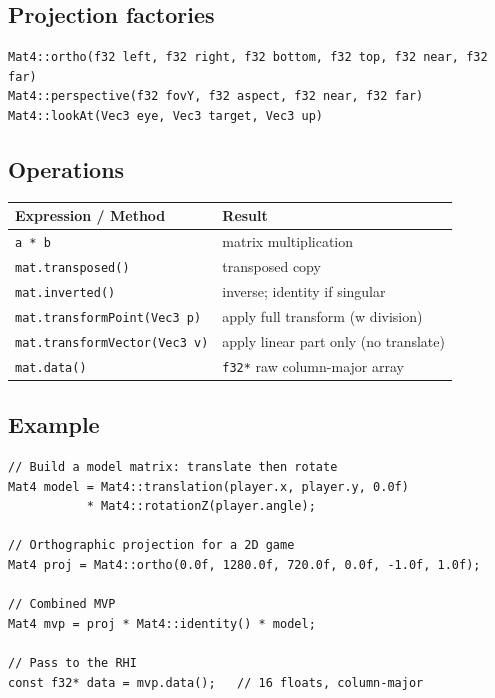\subsection{Projection factories}

\begin{lstlisting}
Mat4::ortho(f32 left, f32 right, f32 bottom, f32 top, f32 near, f32 far)
Mat4::perspective(f32 fovY, f32 aspect, f32 near, f32 far)
Mat4::lookAt(Vec3 eye, Vec3 target, Vec3 up)
\end{lstlisting}

\subsection{Operations}

\begin{longtable}{ll}
\toprule
\textbf{Expression / Method} & \textbf{Result} \\
\midrule
\texttt{a * b}                   & matrix multiplication \\
\texttt{mat.transposed()}        & transposed copy \\
\texttt{mat.inverted()}          & inverse; identity if singular \\
\texttt{mat.transformPoint(Vec3 p)}  & apply full transform (w division) \\
\texttt{mat.transformVector(Vec3 v)} & apply linear part only (no translate) \\
\texttt{mat.data()}              & \texttt{f32*} raw column-major array \\
\bottomrule
\end{longtable}

\subsection{Example}

\begin{lstlisting}
// Build a model matrix: translate then rotate
Mat4 model = Mat4::translation(player.x, player.y, 0.0f)
           * Mat4::rotationZ(player.angle);

// Orthographic projection for a 2D game
Mat4 proj = Mat4::ortho(0.0f, 1280.0f, 720.0f, 0.0f, -1.0f, 1.0f);

// Combined MVP
Mat4 mvp = proj * Mat4::identity() * model;

// Pass to the RHI
const f32* data = mvp.data();   // 16 floats, column-major
\end{lstlisting}
